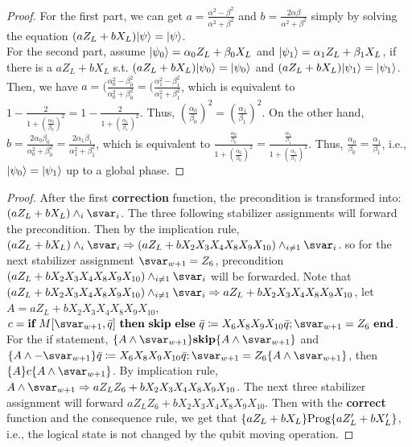 \statestabilizer*
\begin{proof}
For the first part, we can get $a = \frac{\alpha^2 - \beta^2}{\alpha^2 + \beta^2}$ and $b = \frac{2\alpha\beta}{\alpha^2 + \beta^2}$ simply by solving the equation $(a Z_L + b X_L)\vert \psi \rangle = \vert \psi \rangle$. \\
For the second part, assume $\vert \psi_0 \rangle = \alpha_0 Z_L + \beta_0 X_L$ and $\vert \psi_1 \rangle = \alpha_1 Z_L + \beta_1 X_L$, if there is a $aZ_L + bX_L$ s.t. $(aZ_L + bX_L)\vert \psi_0 \rangle = \vert \psi_0 \rangle$ and $(aZ_L + bX_L)\vert \psi_1 \rangle = \vert \psi_1 \rangle$. Then, we have $a = (\frac{\alpha_0^2 - \beta_0^2}{\alpha_0^2 + \beta_0^2} = (\frac{\alpha_1^2 - \beta_1^2}{\alpha_1^2 + \beta_1^2}$, which is equivalent to $1 - \frac{2}{1 + (\frac{\alpha_0}{\beta_0})^2} = 1 - \frac{2}{1 + (\frac{\alpha_1}{\beta_1})^2}$. Thus, $(\frac{\alpha_0}{\beta_0})^2 = (\frac{\alpha_1}{\beta_1})^2$. On the other hand, $b = \frac{2\alpha_0\beta_0}{\alpha_0^2 + \beta_0^2} = \frac{2\alpha_1\beta_1}{\alpha_1^2 + \beta_1^2}$, which is equivalent to $\frac{\frac{\alpha_0}{\beta_0}}{1 + (\frac{\alpha_0}{\beta_0})^2} = \frac{\frac{\alpha_1}{\beta_1}}{1 + (\frac{\alpha_1}{\beta_1})^2}$. Thus, $\frac{\alpha_0}{\beta_0} = \frac{\alpha_1}{\beta_1}$, i.e., $\vert \psi_0 \rangle = \vert \psi_1 \rangle$ up to a global phase.
\end{proof}
\surfvqmov*
\begin{proof}
After the first \textbf{correction} function, the precondition is transformed into: $(a Z_L + b X_L)\wedge_i \svar_i$.
The three following stabilizer assignments will forward the precondition. Then by the implication rule, $(a Z_L + b X_L)\wedge_i \svar_i \Rightarrow (aZ_L + bX_{2}X_{3}X_{4}X_{8}X_{9}X_{10})\wedge_{i \ne 1}\svar_i$. so for the next stabilizer assignment $\svar_{\stabnum +1} = Z_6$, precondition $(aZ_L + bX_{2}X_{3}X_{4}X_{8}X_{9}X_{10}) \wedge_{i \ne 1}\svar_i$ will be forwarded. Note that $(aZ_L + b X_{2} X_{3} X_{4} X_{8} X_{9}X_{10}) \wedge_{i \ne 1}\svar_i \Rightarrow aZ_L + b X_{2} X_{3} X_{4} X_{8} X_{9}X_{10}$,
let $A = aZ_L + b X_{2} X_{3} X_{4} X_{8} X_{9}X_{10}$, \\
$c = \qif{\svar_{\stabnum +1}, \bar{q}}{\textbf{skip}}{\bar{q}\coloneqq X_6X_{8}X_{9}X_{10}\bar{q}; \svar_{\stabnum +1}=Z_6}$. \\
For the if statement, $\{A \wedge \svar_{w+1}\}\textbf{skip}\{A \wedge \svar_{w+1}\}$ and $\{A \wedge -\svar_{w+1}\}\bar{q}\coloneqq X_6X_{8}X_{9}X_{10}\bar{q}; \svar_{\stabnum +1}=Z_6\{A \wedge \svar_{w+1}\}$, then $\{A\}c\{A \wedge \svar_{w+1} \}$.
By implication rule, $A \wedge \svar_{w+1} \Rightarrow aZ_LZ_6 + bX_{2} X_{3} X_{4} X_{8} X_{9}X_{10}$. The next three stabilizer assignment will forward $aZ_LZ_6 + bX_{2} X_{3} X_{4} X_{8} X_{9}X_{10}$. Then with the \textbf{correct} function and the consequence rule, we get that $\{aZ_L + bX_L\}\text{Prog}\{aZ_L' + bX'_L\}$, i.e., the logical state is not changed by the qubit moving operation.
\end{proof}

